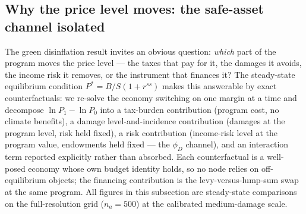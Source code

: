 \documentclass[12pt]{article}
\begin{document}

\subsection{Why the price level moves: the safe-asset channel isolated}
\label{subsec:safeasset}

The green disinflation result invites an obvious question: \emph{which}
part of the program moves the price level --- the taxes that pay for it,
the damages it avoids, the income risk it removes, or the instrument that
finances it? The steady-state equilibrium condition $P^{*} = B/S(1+r^{ss})$
makes this answerable by exact counterfactuals: we re-solve the economy
switching on one margin at a time and decompose
$\ln P_1 - \ln P_0$ into a tax-burden contribution (program cost, no
climate benefits), a damage level-and-incidence contribution (damages at
the program level, risk held fixed), a risk contribution (income-risk
level at the program value, endowments held fixed --- the $\phi_D$
channel), and an interaction term reported explicitly rather than absorbed.
Each counterfactual is a well-posed economy whose own budget identity
holds, so no node relies on off-equilibrium objects; the financing
contribution is the levy-versus-lump-sum swap at the same program. All
figures in this subsection are steady-state comparisons on the
full-resolution grid ($n_a = 500$) at the calibrated medium-damage scale.
\end{document}
